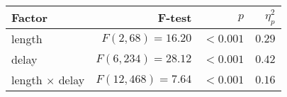 \setlength{\tabcolsep}{0pt} %
\begin{tabular*}{\columnwidth}{@{\extracolsep{\fill}\quad}lrrr@{}}
\textbf{Factor} & \textbf{F-test} & \textbf{\(p\)} & \textbf{\(\eta^{2}_{p}\)} \\ \toprule
length & \(F(2, 68) = 16.20\) & \(<0.001\) & \(0.29\) \\
delay & \(F(6, 234) = 28.12\) & \(<0.001\) & \(0.42\) \\
length \(\times\) delay & \(F(12, 468) = 7.64\) & \(<0.001\) & \(0.16\) \\ \bottomrule
\end{tabular*}%